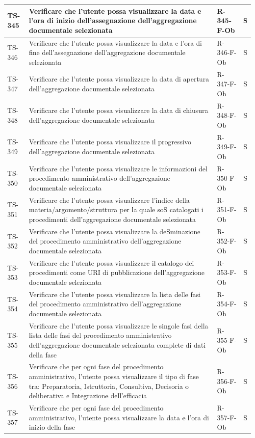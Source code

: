 \documentclass[a4paper,12pt]{article}
\begin{document}
\begin{longtable}{|p{1.5cm}|p{8.3cm}|p{2.4cm}|c|}
\hline
TS-345 & Verificare che l'utente possa visualizzare la data e l'ora di inizio dell'assegnazione dell'aggregazione documentale selezionata & R-345-F-Ob & S \\
\hline
TS-346 & Verificare che l'utente possa visualizzare la data e l'ora di fine dell'assegnazione dell'aggregazione documentale selezionata & R-346-F-Ob & S \\
\hline
TS-347 & Verificare che l'utente possa visualizzare la data di apertura dell'aggregazione documentale selezionata & R-347-F-Ob & S \\
\hline
TS-348 & Verificare che l'utente possa visualizzare la data di chiusura dell'aggregazione documentale selezionata & R-348-F-Ob & S \\
\hline
TS-349 & Verificare che l'utente possa visualizzare il progressivo dell'aggregazione documentale selezionata & R-349-F-Ob & S \\
\hline
TS-350 & Verificare che l'utente possa visualizzare le informazioni del procedimento amministrativo dell'aggregazione documentale selezionata & R-350-F-Ob & S \\
\hline
TS-351 & Verificare che l'utente possa visualizzare l'indice della materia/argomento/struttura per la quale soS catalogati i procedimenti dell'aggregazione documentale selezionata & R-351-F-Ob & S \\
\hline
TS-352 & Verificare che l'utente possa visualizzare la deSminazione del procedimento amministrativo dell'aggregazione documentale selezionata & R-352-F-Ob & S \\
\hline
TS-353 & Verificare che l'utente possa visualizzare il catalogo dei procedimenti come URI di pubblicazione dell'aggregazione documentale selezionata & R-353-F-Ob & S \\
\hline
TS-354 & Verificare che l'utente possa visualizzare la lista delle fasi del procedimento amministrativo dell'aggregazione documentale selezionata & R-354-F-Ob & S \\
\hline
TS-355 & Verificare che l'utente possa visualizzare le singole fasi della lista delle fasi del procedimento amministrativo dell'aggregazione documentale selezionata complete di dati della fase & R-355-F-Ob & S \\
\hline
TS-356 & Verificare che per ogni fase del procedimento amministrativo, l'utente possa visualizzare il tipo di fase tra: Preparatoria, Istruttoria, Consultiva, Decisoria o deliberativa e Integrazione dell'efficacia & R-356-F-Ob & S \\
\hline
TS-357 & Verificare che per ogni fase del procedimento amministrativo, l'utente possa visualizzare la data e l'ora di inizio della fase & R-357-F-Ob & S \\

\end{longtable}
\end{document}
